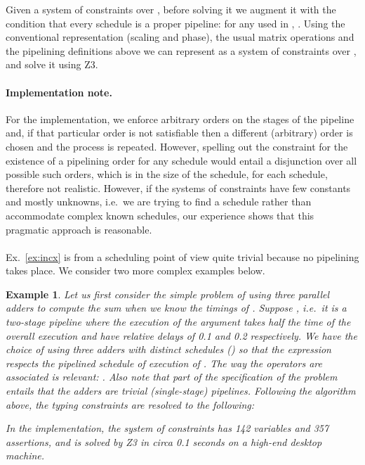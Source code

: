 \documentclass{article}
\newtheorem{example}[theorem]{Example}
\begin{document}
Given a system of constraints  over , before solving it we augment it with the condition that every schedule is a proper pipeline: for any  used in , . Using the conventional representation (scaling and phase), the usual matrix operations and the pipelining definitions above we can represent  as a system of constraints over , and solve it using Z3. 

\paragraph{Implementation note.} For the implementation, we enforce arbitrary orders on the stages of the pipeline and, if that particular order is not satisfiable then a different (arbitrary) order is chosen and the process is repeated. However, spelling out the constraint for the existence of a pipelining order  for any schedule  would entail a disjunction over all possible such orders, which is  in the size of the schedule, for each schedule, therefore not realistic. However, if the systems of constraints have few constants and mostly unknowns, i.e.\ we are trying to find a schedule rather than accommodate complex known schedules, our experience shows that this pragmatic approach is reasonable. 

\paragraph{}
Ex.~\ref{ex:incx} is from a scheduling point of view quite trivial because no pipelining takes
place. We consider two more complex examples below. 

\begin{example}\label{ex:fx4}
Let us first consider the simple problem of using three parallel adders to compute the sum  when we know the timings of . Suppose , i.e.\ it is a two-stage pipeline where the execution of the argument takes half the time of the overall execution and have relative delays of 0.1 and 0.2 respectively. We have the choice of using three adders with distinct schedules  () so that the expression respects the pipelined schedule of execution of . The way the operators are associated is relevant: . Also note that part of the specification of the problem entails that the adders are trivial (single-stage) pipelines. Following the algorithm above, the typing constraints are resolved to the following:

In the implementation, the system of constraints has 142 variables and 357 assertions, and is solved by Z3 in circa 0.1 seconds on a high-end desktop machine.
\end{example}
\end{document}
